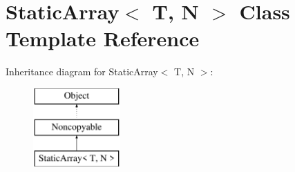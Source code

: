 \hypertarget{classStaticArray}{}\section{Static\+Array$<$ T, N $>$ Class Template Reference}
\label{classStaticArray}
Inheritance diagram for Static\+Array$<$ T, N $>$\+:\begin{figure}[H]
\begin{center}
\leavevmode
\includegraphics[height=3.000000cm]{classStaticArray}
\end{center}
\end{figure}
